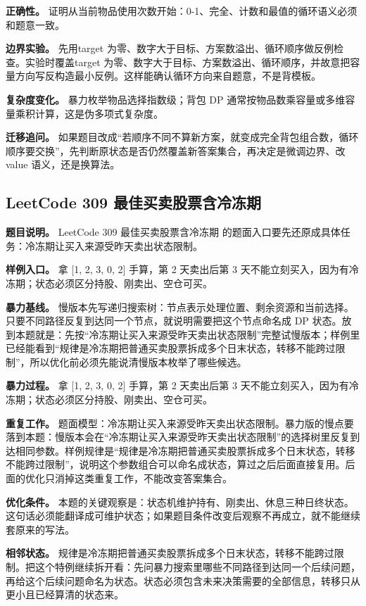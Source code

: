 \textbf{正确性。} 证明从当前物品使用次数开始：0-1、完全、计数和最值的循环语义必须和题意一致。

\textbf{边界实验。} 先用target 为零、数字大于目标、方案数溢出、循环顺序做反例检查。实验时覆盖target 为零、数字大于目标、方案数溢出、循环顺序，并故意把容量方向写反构造最小反例。这样能确认循环方向来自题意，不是背模板。

\textbf{复杂度变化。} 暴力枚举物品选择指数级；背包 DP 通常按物品数乘容量或多维容量乘积计算，这是伪多项式复杂度。

\textbf{迁移追问。} 如果题目改成“若顺序不同不算新方案，就变成完全背包组合数，循环顺序要交换”，先判断原状态是否仍然覆盖新答案集合，再决定是微调边界、改 value 语义，还是换算法。

\subsection{LeetCode 309 最佳买卖股票含冷冻期}

\textbf{题目说明。} LeetCode 309 最佳买卖股票含冷冻期 的题面入口要先还原成具体任务：冷冻期让买入来源受昨天卖出状态限制。

\textbf{样例入口。} 拿 [1, 2, 3, 0, 2] 手算，第 2 天卖出后第 3 天不能立刻买入，因为有冷冻期；状态必须区分持股、刚卖出、空仓可买。

\textbf{暴力基线。} 慢版本先写递归搜索树：节点表示处理位置、剩余资源和当前选择。只要不同路径反复到达同一个节点，就说明需要把这个节点命名成 DP 状态。放到本题就是：先按“冷冻期让买入来源受昨天卖出状态限制”完整试慢版本；样例里已经能看到“规律是冷冻期把普通买卖股票拆成多个日末状态，转移不能跨过限制”，所以优化前必须先能说清慢版本枚举了哪些候选。

\textbf{暴力过程。} 拿 [1, 2, 3, 0, 2] 手算，第 2 天卖出后第 3 天不能立刻买入，因为有冷冻期；状态必须区分持股、刚卖出、空仓可买。

\textbf{重复工作。} 题面模型：冷冻期让买入来源受昨天卖出状态限制。暴力版的慢点要落到本题：慢版本会在“冷冻期让买入来源受昨天卖出状态限制”的选择树里反复到达相同参数。样例规律是“规律是冷冻期把普通买卖股票拆成多个日末状态，转移不能跨过限制”，说明这个参数组合可以命名成状态，算过之后后面直接复用。后面的优化只消掉这类重复工作，不能改变答案集合。

\textbf{优化条件。} 本题的关键观察是：状态机维护持有、刚卖出、休息三种日终状态。这句话必须能翻译成可维护状态；如果题目条件改变后观察不再成立，就不能继续套原来的写法。

\textbf{相邻状态。} 规律是冷冻期把普通买卖股票拆成多个日末状态，转移不能跨过限制。把这个特例继续拆开看：先问暴力搜索里哪些不同路径到达同一个后续问题，再给这个后续问题命名为状态。状态必须包含未来决策需要的全部信息，转移只从更小且已经算清的状态来。

